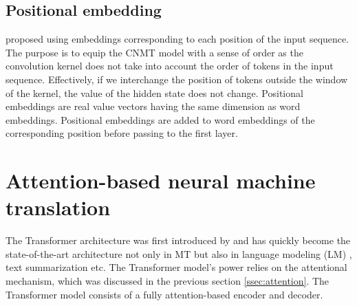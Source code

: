 \subsection{Positional embedding}
\citet{Ghering17convolutional} proposed using embeddings corresponding to each position of the input sequence. The purpose is to equip the CNMT model with a sense of order as the convolution kernel does not take into account the order of tokens in the input sequence. Effectively, if we interchange the position of tokens outside the window of the kernel, the value of the hidden state does not change. Positional embeddings are real value vectors having the same dimension as word embeddings. Positional embeddings are added to word embeddings of the corresponding position before passing to the first layer.

\section{Attention-based neural machine translation} \label{sec:transformer}
The Transformer architecture was first introduced by \citet{Vaswani17attention} and has quickly become the state-of-the-art architecture not only in MT but also in language modeling (LM)  \citep{Devlin19bert,Conneau19cross,Brown20language}, text summarization \citep{Zhang20pegasus} etc. The Transformer model's power relies on the attentional mechanism, which was discussed in the previous section \ref{ssec:attention}. The Transformer model consists of a fully attention-based encoder and decoder. 
